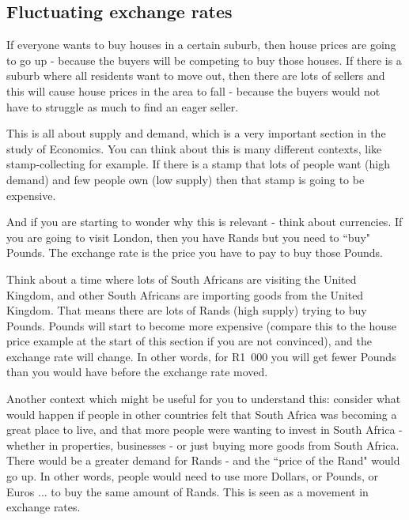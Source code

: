       
      \label{m39335*uid17}
            \subsection{ Fluctuating exchange rates}
            \nopagebreak
            
        
        \label{m39335*id68515}If everyone wants to buy houses in a certain suburb, then house prices are going to go up - because the buyers will be competing to buy those houses. If there is a suburb where all residents want to move out, then there are lots of sellers and this will cause house prices in the area to fall - because the buyers would not have to struggle as much to find an eager seller.\par 
        \label{m39335*id68522}This is all about supply and demand, which is a very important section in the study of Economics. You can think about this is many different contexts, like stamp-collecting for example. If there is a stamp that lots of people want (high demand) and few people own (low supply) then that stamp is going to be expensive.\par 
        \label{m39335*id68528}And if you are starting to wonder why this is relevant - think about currencies. If you are going to visit London, then you have Rands but you need to ``buy" Pounds. The exchange rate is the price you have to pay to buy those Pounds.\par 
        \label{m39335*id68535}Think about a time where lots of South Africans are visiting the United Kingdom, and other South Africans are importing goods from the United Kingdom. That means there are lots of Rands (high supply) trying to buy Pounds. Pounds will start to become more expensive (compare this to the house price example at the start of this section if you are not convinced), and the exchange rate will change. In other words, for R1~000 you will get fewer Pounds than you would have before the exchange rate moved.\par 
        \label{m39335*id68547}Another context which might be useful for you to understand this: consider what would happen if people in other countries felt that South Africa was becoming a great place to live, and that more people were wanting to invest in South Africa - whether in properties, businesses - or just buying more goods from South Africa. There would be a greater demand for Rands - and the ``price of the Rand" would go up. In other words, people would need to use more Dollars, or Pounds, or Euros ... to buy the same amount of Rands. This is seen as a movement in exchange rates.\par 
